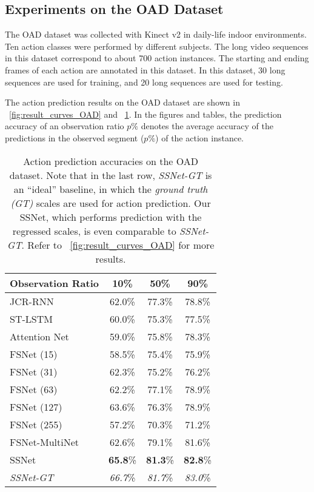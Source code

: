 \documentclass[10pt,twocolumn,letterpaper]{article}
\begin{document}
\subsection{Experiments on the OAD Dataset}



The OAD dataset \cite{li2016online} was collected with Kinect v2 in daily-life indoor environments.
Ten action classes were performed by different subjects.
The long video sequences in this dataset correspond to about 700 action instances. The starting and ending frames of each action are annotated in this dataset.
In this dataset,
30 long sequences are used for training, and 20 long sequences are used for testing.



The action prediction results on the OAD dataset are shown in \figurename{~\ref{fig:result_curves_OAD}} and \tablename{~\ref{table:resultOAD}}.
In the figures and tables,
the prediction accuracy of an observation ratio $p\%$ denotes the average accuracy of the
predictions in the observed segment ($p\%$) of the action instance.  


\begin{table}[htbp]
	\caption{Action prediction accuracies on the OAD dataset.
        Note that in the last row, \emph{SSNet-GT} is an ``ideal'' baseline,
		in which the \emph{ground truth (GT)} scales are used for action prediction.
		Our SSNet, which performs prediction with the regressed scales, is even comparable to \emph{SSNet-GT}.
        Refer to \figurename{~\ref{fig:result_curves_OAD}} for more results.
	}
	\label{table:resultOAD}
	\centering
    \small
	\begin{tabular}{lccc}
    \toprule
    Observation Ratio                    & 10\% & 50\% & 90\% \\
    \midrule JCR-RNN                              & 62.0\% & 77.3\% & 78.8\% \\
    ST-LSTM                              & 60.0\% & 75.3\% & 77.5\% \\
    Attention Net                        & 59.0\% & 75.8\% & 78.3\% \\
    \midrule
    FSNet (15)                           & 58.5\% & 75.4\% & 75.9\% \\
    FSNet (31)                           & 62.3\% & 75.2\% & 76.2\% \\
    FSNet (63)                           & 62.2\% & 77.1\% & 78.9\% \\
    FSNet (127)                          & 63.6\% & 76.3\% & 78.9\% \\
    FSNet (255)                          & 57.2\% & 70.3\% & 71.2\% \\
    FSNet-MultiNet                       & 62.6\% & 79.1\% & 81.6\% \\
    \midrule
    SSNet                                & \textbf{65.8}\%& \textbf{81.3}\% & \textbf{82.8}\% \\
    \midrule
    \emph{SSNet-GT}                      & \emph{66.7}\% & \emph{81.7}\% & \emph{83.0}\% \\
    \bottomrule
	\end{tabular}
\end{table}
\end{document}
